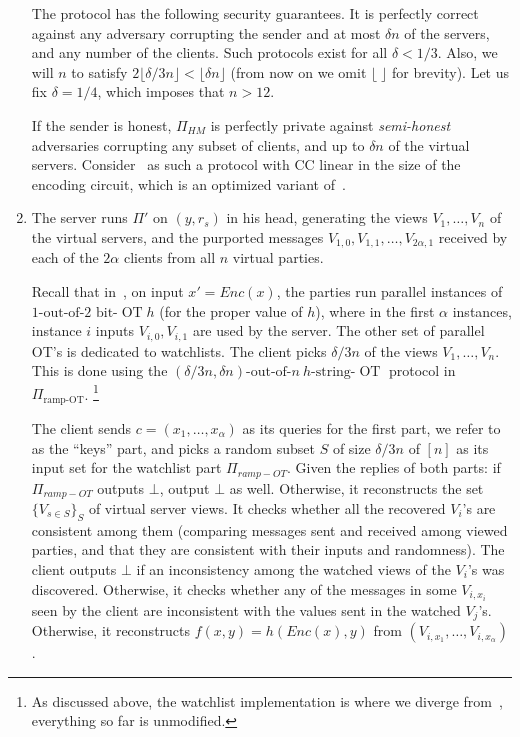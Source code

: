 \documentclass{llncs}
\newcommand{\OT}{\operatorname{OT}}
\newcommand{\bOT}[2]{#1\text{-out-of-}#2\text{ bit-}\OT}
\newcommand{\sOT}[3]{#1\text{-out-of-}#2~#3\text{-string-}\OT}
\begin{document}
\begin{construction}
\begin{enumerate}
	The protocol has the following security guarantees.
	It is perfectly correct against any adversary corrupting
	the sender and at most $\delta n$ of the servers, and any number of the clients. Such protocols exist for all $\delta<1/3$.
	Also, we will $n$ to satisfy $2\lfloor \delta/3 n\rfloor < \lfloor \delta n\rfloor$ (from now on we omit $\lfloor\;\rfloor$ for brevity). Let us fix $\delta = 1/4$, which imposes that $n > 12$.
	
	If the sender is honest, $\Pi_{HM}$ is perfectly private against \emph{semi-honest} adversaries corrupting any subset of clients, and up to $\delta n$ of the virtual servers. 
	Consider~\cite{BGW88} as such a protocol with CC linear in the size of the encoding circuit, which is an optimized variant of~\cite{BGW88}.
	\item The server runs $\Pi'$ on $(y,r_s)$ in his head, generating the views $V_1,\ldots,V_n$ of the virtual servers, and the purported messages $V_{1,0},V_{1,1},\ldots,V_{2\alpha,1}$ received by each of the $2\alpha$ clients from all $n$ virtual parties.
	
	Recall that in~\cite{IKOPS11}, on input $x'=Enc(x)$, the parties run
	parallel instances of $\bOT{1}{2}{h}$ (for the proper value of $h$), where in the first $\alpha$ instances, instance $i$ inputs $V_{i,0},V_{i,1}$ are used by the server. 
	The other set of parallel OT's is dedicated to watchlists.
	The client picks $\delta/3 n$  of the views $V_1,\ldots,V_n$.
	This is done using the $\sOT{(\delta/3n ,\delta n)}{n}{h}$ protocol in $\Pi_{\text{ramp-OT}}$. 
	\footnote{As discussed above, the watchlist implementation is where we diverge from~\cite{IKOPS11}, everything so far is unmodified.}
	
	The client sends $c=(x_1,\ldots,x_\alpha)$ as its queries for the first part, we refer to as the ``keys'' part, and picks a random subset $S$ of size $\delta/3 n$ of $[n]$ as its input set for the watchlist part $\Pi_{ramp-OT}$.
	Given the replies of both parts: if $\Pi_{ramp-OT}$ outputs $\bot$, output $\bot$ as well. Otherwise, it reconstructs the set $\{V_{s\in S}\}_S$ of virtual server views.
	It checks whether all the recovered $V_i$'s are consistent among them (comparing messages sent and received among viewed parties, and that they are consistent with their inputs and randomness).
	The client outputs $\bot$ if an inconsistency among the watched views of the $V_i$'s was discovered. Otherwise, it checks whether any of the messages in some $V_{i,x_i}$ seen by the client are inconsistent with the values sent in the watched $V_j$'s. Otherwise, it reconstructs $f(x,y)=h(Enc(x),y)$ from $(V_{i,x_1},\ldots,V_{i,x_\alpha})$. 
	
	\end{enumerate}
\end{construction}	
\end{document}
